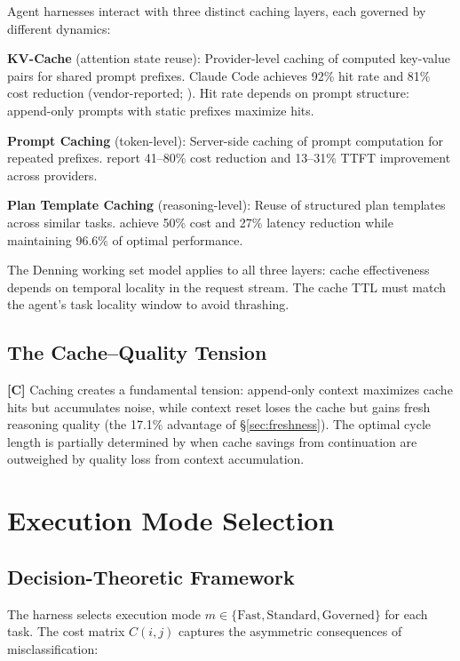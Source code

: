 \documentclass[11pt, a4paper, copyright]{googledeepmind}
\begin{document}
Agent harnesses interact with three distinct caching layers, each governed by different dynamics:

\textbf{KV-Cache} (attention state reuse): Provider-level caching of computed key-value pairs for shared prompt prefixes. Claude Code achieves 92\% hit rate and 81\% cost reduction (vendor-reported; \citealt{anthropic2026agentic}). Hit rate depends on prompt structure: append-only prompts with static prefixes maximize hits.

\textbf{Prompt Caching} (token-level): Server-side caching of prompt computation for repeated prefixes. \citet{liang2026cache} report 41--80\% cost reduction and 13--31\% TTFT improvement across providers.

\textbf{Plan Template Caching} (reasoning-level): Reuse of structured plan templates across similar tasks. \citet{zhang2025apc} achieve 50\% cost and 27\% latency reduction while maintaining 96.6\% of optimal performance.

The Denning working set model \citep{denning1968working} applies to all three layers: cache effectiveness depends on temporal locality in the request stream. The cache TTL must match the agent's task locality window to avoid thrashing.

\subsection{The Cache--Quality Tension}

\textbf{[C]} Caching creates a fundamental tension: append-only context maximizes cache hits but accumulates noise, while context reset loses the cache but gains fresh reasoning quality (the 17.1\% advantage of \S\ref{sec:freshness}). The optimal cycle length is partially determined by when cache savings from continuation are outweighed by quality loss from context accumulation.


\section{Execution Mode Selection}\label{sec:modes}

\subsection{Decision-Theoretic Framework}

The harness selects execution mode $m \in \{\text{Fast}, \text{Standard}, \text{Governed}\}$ for each task. The cost matrix $C(i,j)$ captures the asymmetric consequences of misclassification:
\end{document}

